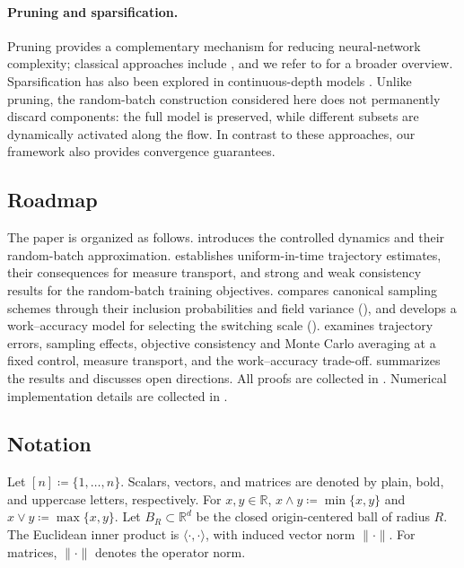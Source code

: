 \documentclass[twoside,11pt]{article}
\theoremstyle{plain}
\def\R{\mathbb R}
\begin{document}
\paragraph{\textbf{Pruning and sparsification.}}
Pruning provides a complementary mechanism for reducing neural-network complexity; classical approaches include \cite{LeCun1990,Hassibi1993,Han2015,Han2016}, and we refer to \cite{ChengSurveyPruning2024} for a broader overview. Sparsification has also been explored in continuous-depth models \cite{liebenwein2021sparse,pmlr-v202-mo23c}. Unlike pruning, the random-batch construction considered here does not permanently discard components: the full model is preserved, while different subsets are dynamically activated along the flow. In contrast to these approaches, our framework also provides convergence guarantees.

\subsection{Roadmap}

The paper is organized as follows.
 introduces the controlled dynamics and their random-batch approximation.
 establishes uniform-in-time trajectory estimates, their consequences for measure transport, and strong and weak consistency results for the random-batch training objectives.
 compares canonical sampling schemes through their inclusion probabilities and field variance (), and develops a work--accuracy model for selecting the switching scale ().
 examines trajectory errors, sampling effects, objective consistency and Monte Carlo averaging at a fixed control, measure transport, and the work--accuracy trade-off.
 summarizes the results and discusses open directions.
All proofs are collected in . Numerical implementation details are collected in .


\subsection{Notation}\label{ss:notation}
Let $[n]\coloneqq \{1,\dots,n\}$. Scalars, vectors, and matrices are denoted by plain, bold, and uppercase letters, respectively. For $x,y\in\R$, $x\wedge y\coloneqq \min\{x,y\}$ and $x\vee y \coloneqq \max\{x,y\}$. Let $B_R\subset\R^d$ be the closed origin-centered ball of radius $R$. The Euclidean inner product is $\langle \cdot,\cdot\rangle$, with induced vector norm $\|\cdot\|$. For matrices, $\|\cdot\|$ denotes the operator norm. 
\end{document}
